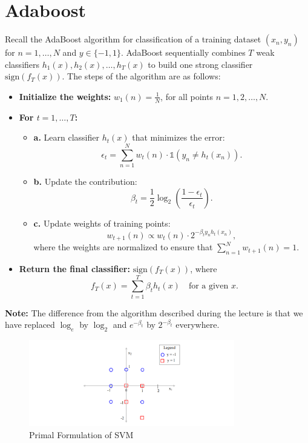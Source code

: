 \documentclass[a3paper,12pt]{extarticle} %
\begin{document}
\newpage
\section{Adaboost}
Recall the AdaBoost algorithm for classification of a training dataset $(x_n, y_n)$ for $n = 1, \dots, N$ and $y \in \{-1, 1\}$. AdaBoost sequentially combines $T$ weak classifiers $h_1(x), h_2(x), \dots, h_T(x)$ to build one strong classifier $\text{sign}(f_T(x))$. The steps of the algorithm are as follows:

\begin{itemize}
    \item \textbf{Initialize the weights:} $w_1(n) = \frac{1}{N}$, for all points $n = 1, 2, \dots, N$.
    \item \textbf{For $t = 1, \dots, T$:}
    \begin{itemize}
        \item \textbf{a.} Learn classifier $h_t(x)$ that minimizes the error:
        \[
        \epsilon_t = \sum_{n=1}^N w_t(n) \cdot \mathbb{1}(y_n \neq h_t(x_n)).
        \]
        \item \textbf{b.} Update the contribution:
        \[
        \beta_t = \frac{1}{2} \log_2\left(\frac{1 - \epsilon_t}{\epsilon_t}\right).
        \]
        \item \textbf{c.} Update weights of training points:
        \[
        w_{t+1}(n) \propto w_t(n) \cdot 2^{-\beta_t y_n h_t(x_n)},
        \]
        where the weights are normalized to ensure that $\sum_{n=1}^N w_{t+1}(n) = 1$.
    \end{itemize}
    \item \textbf{Return the final classifier:} $\text{sign}(f_T(x))$, where
    \[
    f_T(x) = \sum_{t=1}^T \beta_t h_t(x) \quad \text{for a given } x.
    \]
\end{itemize}

\textbf{Note:} The difference from the algorithm described during the lecture is that we have replaced $\log_e$ by $\log_2$ and $e^{-\beta_t}$ by $2^{-\beta_t}$ everywhere.
\begin{figure}[h]
    \centering
    \includegraphics[width=0.8\textwidth]{adaboost.png}
    \caption{Primal Formulation of SVM}
    \label{fig:primal}
\end{figure}
\end{document}
